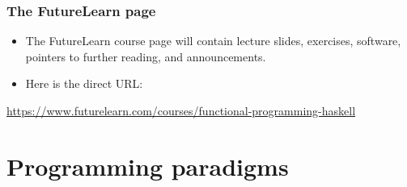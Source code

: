 \documentclass{beamer}
\begin{document}
\begin{frame}[fragile]
\frametitle{The FutureLearn page}

\begin{itemize}
\item The FutureLearn course page will contain lecture slides, exercises,
  software, pointers to further reading, and announcements.
\item Here is the direct URL:
\end{itemize}

\url{https://www.futurelearn.com/courses/functional-programming-haskell}

\end{frame}
%
%

\section{Programming paradigms}
\end{document}
